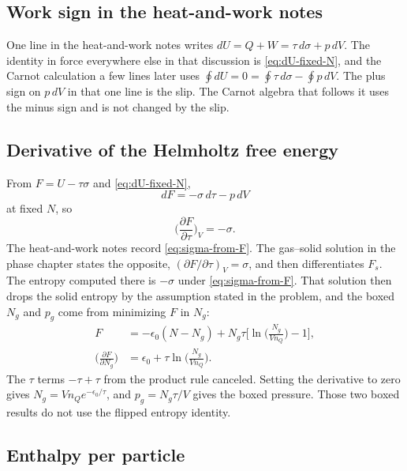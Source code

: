 \subsection{Work sign in the heat-and-work notes}
\label{sec:work-sign}

One line in the heat-and-work notes writes \(dU = Q + W = \tau\, d\sigma + p\, dV\). The identity in force everywhere else in that discussion is \eqref{eq:dU-fixed-N}, and the Carnot calculation a few lines later uses \(\oint dU = 0 = \oint \tau\, d\sigma - \oint p\, dV\). The plus sign on \(p\, dV\) in that one line is the slip. The Carnot algebra that follows it uses the minus sign and is not changed by the slip.

\subsection{Derivative of the Helmholtz free energy}
\label{sec:helmholtz-sign}

From \(F = U - \tau\sigma\) and \eqref{eq:dU-fixed-N},
\begin{equation}
\label{eq:dF}
dF = -\sigma\, d\tau - p\, dV
\end{equation}
at fixed \(N\), so
\begin{equation}
\label{eq:sigma-from-F}
\biggl(\frac{\partial F}{\partial\tau}\biggr)_{V} = -\sigma.
\end{equation}
The heat-and-work notes record \eqref{eq:sigma-from-F}. The gas--solid solution in the phase chapter states the opposite, \((\partial F/\partial\tau)_{V} = \sigma\), and then differentiates \(F_s\). The entropy computed there is \(-\sigma\) under \eqref{eq:sigma-from-F}. That solution then drops the solid entropy by the assumption stated in the problem, and the boxed \(N_g\) and \(p_g\) come from minimizing \(F\) in \(N_g\):
\begin{align}
F
&= -\epsilon_0 (N-N_g) + N_g\tau\Biggl[\ln\biggl(\frac{N_g}{V n_Q}\biggr) - 1\Biggr], \nonumber\\
\biggl(\frac{\partial F}{\partial N_g}\biggr)
&= \epsilon_0 + \tau\ln\biggl(\frac{N_g}{V n_Q}\biggr).
\label{eq:dF-dNg}
\end{align}
The \(\tau\) terms \(-\tau + \tau\) from the product rule canceled. Setting the derivative to zero gives \(N_g = V n_Q e^{-\epsilon_0/\tau}\), and \(p_g = N_g\tau/V\) gives the boxed pressure. Those two boxed results do not use the flipped entropy identity.

\subsection{Enthalpy per particle}
\label{sec:enthalpy-per-particle}

